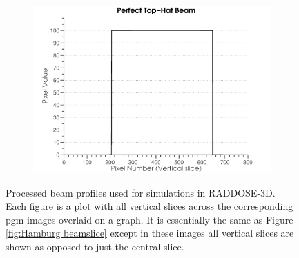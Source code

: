 \begin{figure}
\begin{subfigure}[b]{0.45\textwidth}
                \centering
                \includegraphics[width=\textwidth]{figures/beam/fig_beam_ideal.pdf}
                \caption{}
                \label{figallbeams9}
        \end{subfigure}
        \caption{Processed beam profiles used for simulations in RADDOSE-3D.
        Each figure is a plot with all vertical slices across the corresponding pgm images overlaid on a graph.
        It is essentially the same as Figure \ref{fig:Hamburg beamslice} except in these images all vertical slices are shown as opposed to just the central slice.}
        \label{figallbeamscont}
\end{figure}


